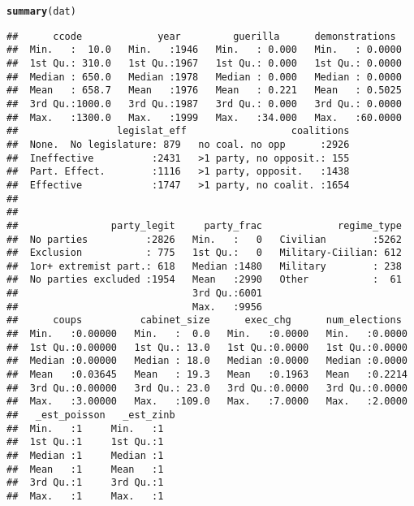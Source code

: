\documentclass[onesided]{article}\usepackage[]{graphicx}\usepackage[]{color}
\makeatletter
\newcommand{\hlstd}[1]{\textcolor[rgb]{0.345,0.345,0.345}{#1}}%
\newcommand{\hlkwd}[1]{\textcolor[rgb]{0.737,0.353,0.396}{\textbf{#1}}}%
\newenvironment{kframe}{%
 \def\at@end@of@kframe{}%
 \ifinner\ifhmode%
  \def\at@end@of@kframe{\end{minipage}}%
  \begin{minipage}{\columnwidth}%
 \fi\fi%
 \def\FrameCommand##1{\hskip\@totalleftmargin \hskip-\fboxsep
 \colorbox{shadecolor}{##1}\hskip-\fboxsep
     \hskip-\linewidth \hskip-\@totalleftmargin \hskip\columnwidth}%
 \MakeFramed {\advance\hsize-\width
   \@totalleftmargin\z@ \linewidth\hsize
   \@setminipage}}%
 {\par\unskip\endMakeFramed%
 \at@end@of@kframe}
\newenvironment{knitrout}{}{} %
\makeatother
\begin{document}
\begin{knitrout}
\color{fgcolor}\begin{kframe}
\begin{alltt}
\hlkwd{summary}\hlstd{(dat)}
\end{alltt}
\begin{verbatim}
##      ccode             year         guerilla      demonstrations   
##  Min.   :  10.0   Min.   :1946   Min.   : 0.000   Min.   : 0.0000  
##  1st Qu.: 310.0   1st Qu.:1967   1st Qu.: 0.000   1st Qu.: 0.0000  
##  Median : 650.0   Median :1978   Median : 0.000   Median : 0.0000  
##  Mean   : 658.7   Mean   :1976   Mean   : 0.221   Mean   : 0.5025  
##  3rd Qu.:1000.0   3rd Qu.:1987   3rd Qu.: 0.000   3rd Qu.: 0.0000  
##  Max.   :1300.0   Max.   :1999   Max.   :34.000   Max.   :60.0000  
##                 legislat_eff                  coalitions  
##  None.  No legislature: 879   no coal. no opp      :2926  
##  Ineffective          :2431   >1 party, no opposit.: 155  
##  Part. Effect.        :1116   >1 party, opposit.   :1438  
##  Effective            :1747   >1 party, no coalit. :1654  
##                                                           
##                                                           
##                party_legit     party_frac             regime_type  
##  No parties          :2826   Min.   :   0   Civilian        :5262  
##  Exclusion           : 775   1st Qu.:   0   Military-Ciilian: 612  
##  1or+ extremist part.: 618   Median :1480   Military        : 238  
##  No parties excluded :1954   Mean   :2990   Other           :  61  
##                              3rd Qu.:6001                          
##                              Max.   :9956                          
##      coups          cabinet_size      exec_chg      num_elections   
##  Min.   :0.00000   Min.   :  0.0   Min.   :0.0000   Min.   :0.0000  
##  1st Qu.:0.00000   1st Qu.: 13.0   1st Qu.:0.0000   1st Qu.:0.0000  
##  Median :0.00000   Median : 18.0   Median :0.0000   Median :0.0000  
##  Mean   :0.03645   Mean   : 19.3   Mean   :0.1963   Mean   :0.2214  
##  3rd Qu.:0.00000   3rd Qu.: 23.0   3rd Qu.:0.0000   3rd Qu.:0.0000  
##  Max.   :3.00000   Max.   :109.0   Max.   :7.0000   Max.   :2.0000  
##   _est_poisson   _est_zinb
##  Min.   :1     Min.   :1  
##  1st Qu.:1     1st Qu.:1  
##  Median :1     Median :1  
##  Mean   :1     Mean   :1  
##  3rd Qu.:1     3rd Qu.:1  
##  Max.   :1     Max.   :1
\end{verbatim}
\end{kframe}
\end{knitrout}
\end{document}
